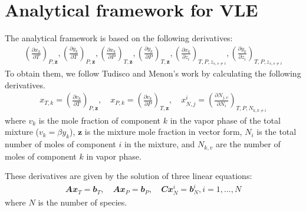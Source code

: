 \section{Analytical framework for VLE} 
\label{App:VLE}
The analytical framework is based on the following derivatives:
\begin{align}
\left(\frac{\partial x_k}{\partial T}\right)_{P,\mathbf{z}},\left(\frac{\partial y_k}{\partial T}\right)_{P,\mathbf{z}},\left(\frac{\partial x_k}{\partial P}\right)_{T,\mathbf{z}},\left(\frac{\partial y_k}{\partial P}\right)_{T,\mathbf{z}},\left(\frac{\partial x_k}{\partial z_i}\right)_{T,P,z_{s,s\neq i}},\left(\frac{\partial y_k}{\partial z_i}\right)_{T,P,z_{s,s\neq i}} \label{eq:app:6derivatives}
\end{align}
To obtain them, we follow Tudisco and Menon's work \cite{tudisco2020analytical} by calculating the following derivatives. 
\begin{align}
x_{T,k}=\left(\frac{\partial v_k}{\partial T}\right)_{P,\mathbf{z}},\quad
x_{P,k}=\left(\frac{\partial v_k}{\partial P}\right)_{T,\mathbf{z}},\quad
x_{N,j}^i=\left(\frac{\partial N_{j,v}}{\partial N_i}\right)_{T,P,N_{k,k\neq i}}
\end{align}
where $v_k$ is the mole fraction of component $k$ in the vapor phase of the total mixture ($v_k = \beta y_k$), $\mathbf{z}$ is the mixture mole fraction in vector form, 
$N_i$ is the total number of moles of component $i$ in the mixture, and $N_{k,v}$ are the number of moles of component $k$ in vapor phase.

These derivatives are given by the solution of three linear equations:
\begin{align}
\mathbfit{A} \mathbfit{x}_T = \mathbfit{b}_T, \quad
\mathbfit{A} \mathbfit{x}_P = \mathbfit{b}_P, \quad
\mathbfit{C}\mathbfit{x}_N^i=\mathbfit{b}_N^i, i = 1,...,N
\end{align}
where $N$ is the number of species.

